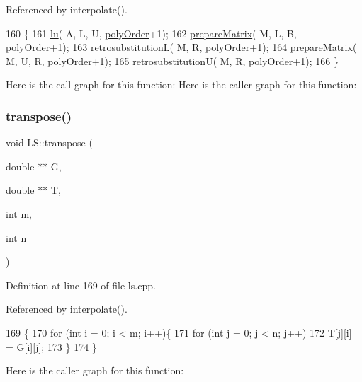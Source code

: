 Referenced by interpolate().


\begin{DoxyCode}
160                                                                                                          \{
161     \hyperlink{class_l_s_aadf10e2c4121ce5f0b42981f7c1d15d7}{lu}( A, L, U, \hyperlink{class_l_s_aecf61c51ef6717acc81b737e298e4236}{polyOrder}+1);
162     \hyperlink{class_l_s_a84e538a99f84e3f72d3a89a725d9d7d8}{prepareMatrix}( M, L, B, \hyperlink{class_l_s_aecf61c51ef6717acc81b737e298e4236}{polyOrder}+1);
163     \hyperlink{class_l_s_ada47f10ff595a886a79bb0f4eacbe7d7}{retrosubstitutionL}( M, \hyperlink{class_l_s_ade8c978a7d99f10950790c0dfec9f556}{R}, \hyperlink{class_l_s_aecf61c51ef6717acc81b737e298e4236}{polyOrder}+1);
164     \hyperlink{class_l_s_a84e538a99f84e3f72d3a89a725d9d7d8}{prepareMatrix}( M, U, \hyperlink{class_l_s_ade8c978a7d99f10950790c0dfec9f556}{R}, \hyperlink{class_l_s_aecf61c51ef6717acc81b737e298e4236}{polyOrder}+1);
165     \hyperlink{class_l_s_a092e4964121ae088307af8622af7ab64}{retrosubstitutionU}( M, \hyperlink{class_l_s_ade8c978a7d99f10950790c0dfec9f556}{R}, \hyperlink{class_l_s_aecf61c51ef6717acc81b737e298e4236}{polyOrder}+1);
166 \}
\end{DoxyCode}
Here is the call graph for this function\+:
Here is the caller graph for this function\+:
\mbox{\label{class_l_s_a405e4288332cf4165c5cbacdbfc82783}} 
\subsubsection{\texorpdfstring{transpose()}{transpose()}}
{\footnotesize\ttfamily void L\+S\+::transpose (\begin{DoxyParamCaption}\item[{double $\ast$$\ast$}]{G,  }\item[{double $\ast$$\ast$}]{T,  }\item[{int}]{m,  }\item[{int}]{n }\end{DoxyParamCaption})\hspace{0.3cm}{\ttfamily [private]}}



Definition at line 169 of file ls.\+cpp.



Referenced by interpolate().


\begin{DoxyCode}
169                                                         \{
170     \textcolor{keywordflow}{for} (\textcolor{keywordtype}{int} i = 0; i < m; i++)\{
171         \textcolor{keywordflow}{for} (\textcolor{keywordtype}{int} j = 0; j < n; j++)
172             T[j][i] = G[i][j];
173     \}
174 \}
\end{DoxyCode}
Here is the caller graph for this function\+:
\mbox{\label{class_l_s_a2825429a29497b5dbad69a8b77f42d00}} 
